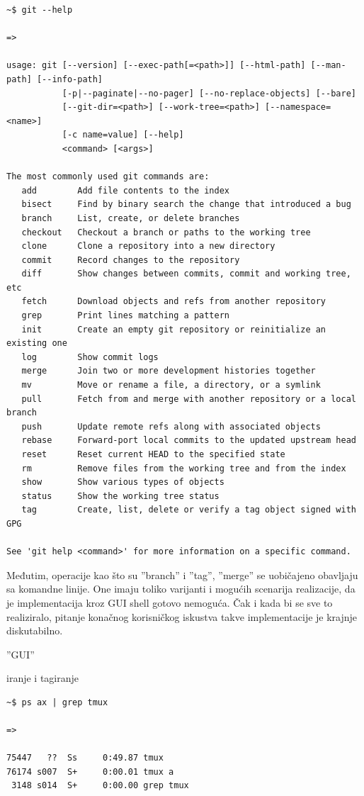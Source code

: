 \documentclass[times, utf8, seminar]{fit}
\begin{document}
\begin{lstlisting}
~$ git --help

=>

usage: git [--version] [--exec-path[=<path>]] [--html-path] [--man-path] [--info-path]
           [-p|--paginate|--no-pager] [--no-replace-objects] [--bare]
           [--git-dir=<path>] [--work-tree=<path>] [--namespace=<name>]
           [-c name=value] [--help]
           <command> [<args>]

The most commonly used git commands are:
   add        Add file contents to the index
   bisect     Find by binary search the change that introduced a bug
   branch     List, create, or delete branches
   checkout   Checkout a branch or paths to the working tree
   clone      Clone a repository into a new directory
   commit     Record changes to the repository
   diff       Show changes between commits, commit and working tree, etc
   fetch      Download objects and refs from another repository
   grep       Print lines matching a pattern
   init       Create an empty git repository or reinitialize an existing one
   log        Show commit logs
   merge      Join two or more development histories together
   mv         Move or rename a file, a directory, or a symlink
   pull       Fetch from and merge with another repository or a local branch
   push       Update remote refs along with associated objects
   rebase     Forward-port local commits to the updated upstream head
   reset      Reset current HEAD to the specified state
   rm         Remove files from the working tree and from the index
   show       Show various types of objects
   status     Show the working tree status
   tag        Create, list, delete or verify a tag object signed with GPG

See 'git help <command>' for more information on a specific command.
\end{lstlisting}

Međutim, operacije kao što su ''branch'' i ''tag'', ''merge'' se uobičajeno obavljaju sa komandne linije.
One imaju toliko varijanti i mogućih scenarija realizacije, da je implementacija kroz GUI shell gotovo nemoguća. Čak i kada bi se sve to realiziralo, pitanje konačnog korisničkog iskustva takve implementacije je krajnje diskutabilno.

''GUI''


iranje i tagiranje


\begin{lstlisting}
~$ ps ax | grep tmux

=>

75447   ??  Ss     0:49.87 tmux
76174 s007  S+     0:00.01 tmux a
 3148 s014  S+     0:00.00 grep tmux
\end{lstlisting}
\end{document}
